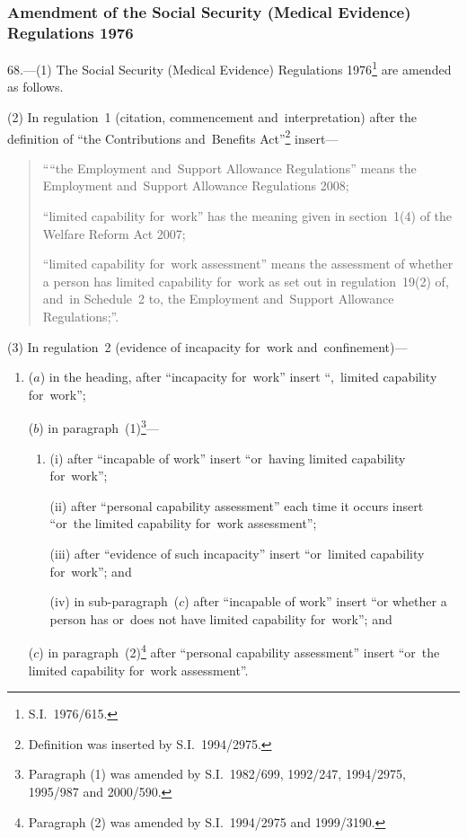 \documentclass[12pt,a4paper]{article}
\begin{document}
\subsubsection[68. Amendment of the Social Security (Medical Evidence) Regulations 1976]{Amendment of the Social Security (Medical Evidence) Regulations 1976}

68.---(1)  The Social Security (Medical Evidence) Regulations 1976\footnote{S.I.~1976/615.} are amended as follows.

(2) In regulation~1 (citation, commencement and~interpretation) after the definition of “the Contributions and~Benefits Act”\footnote{Definition was inserted by S.I.~1994/2975.} insert—
\begin{quotation}
““the Employment and~Support Allowance Regulations” means the Employment and~Support Allowance Regulations 2008;

“limited capability for~work” has the meaning given in section~1(4) of the Welfare Reform Act 2007;

“limited capability for~work assessment” means the assessment of whether a person has limited capability for~work as set out in regulation~19(2) of, and~in Schedule~2 to, the Employment and~Support Allowance Regulations;”.
\end{quotation}

(3) In regulation~2 (evidence of incapacity for~work and~confinement)—
\begin{enumerate}\item[]
($a$) in the heading, after “incapacity for~work” insert “,~limited capability for~work”;

($b$) in paragraph~(1)\footnote{Paragraph (1) was amended by S.I.~1982/699, 1992/247, 1994/2975, 1995/987 and 2000/590.}—
\begin{enumerate}\item[]
(i) after “incapable of work” insert “or~having limited capability for~work”;

(ii) after “personal capability assessment” each time it occurs insert “or~the limited capability for~work assessment”;

(iii) after “evidence of such incapacity” insert “or~limited capability for~work”; and

(iv) in sub-paragraph~($c$)  after “incapable of work” insert “or whether a person has or~does not have limited capability for~work”; and
\end{enumerate}

($c$) in paragraph~(2)\footnote{Paragraph (2) was amended by S.I.~1994/2975 and 1999/3190.} after “personal capability assessment” insert “or~the limited capability for~work assessment”.
\end{enumerate}
\end{document}
